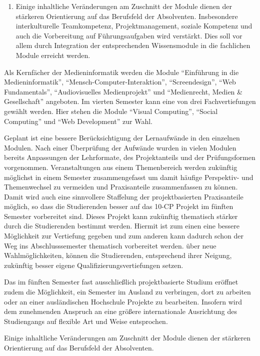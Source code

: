 \begin{enumerate}
\def\labelenumi{\arabic{enumi}.}
\setcounter{enumi}{3}
\tightlist
\item
  Einige inhaltliche Veränderungen am Zuschnitt der Module dienen der
  stärkeren Orientierung auf das Berufsfeld der Absolventen.
  Insbesondere interkulturelle Teamkompetenz, Projektmanagement, soziale
  Kompetenz und auch die Vorbereitung auf Führungsaufgaben wird
  verstärkt. Dies soll vor allem durch Integration der entsprechenden
  Wissensmodule in die fachlichen Module erreicht werden.
\end{enumerate}

Als Kernfächer der Medieninformatik werden die Module ``Einführung in
die Medieninformatik'', ``Mensch-Computer-Interaktion'',
``Screendesign'', ``Web Fundamentals'', ``Audiovisuelles Medienprojekt''
und ``Medienrecht, Medien \& Gesellschaft'' angeboten. Im vierten
Semester kann eine von drei Fachvertiefungen gewählt werden. Hier stehen
die Module ``Visual Computing'', ``Social Computing'' und ``Web
Development'' zur Wahl.

Geplant ist eine bessere Berücksichtigung der Lernaufwände in den
einzelnen Modulen. Nach einer Überprüfung der Aufwände wurden in vielen
Modulen bereits Anpassungen der Lehrformate, des Projektanteils und der
Prüfungsformen vorgenommen. Veranstaltungen aus einem Themenbereich
werden zukünftig möglichst in einem Semester zusammengefasst um damit
häufige Perspektiv- und Themenwechsel zu vermeiden und Praxisanteile
zusammenfassen zu können. Damit wird auch eine sinnvollere Staffelung
der projektbasierten Praxisanteile möglich, so dass die Studierenden
besser auf das 10-CP Projekt im fünften Semester vorbereitet sind.
Dieses Projekt kann zukünftig thematisch stärker durch die Studierenden
bestimmt werden. Hiermit ist zum einen eine bessere Möglichkeit zur
Vertiefung gegeben und zum anderen kann dadurch schon der Weg ins
Abschlusssemester thematisch vorbereitet werden. über neue
Wahlmöglichkeiten, können die Studierenden, entsprechend ihrer Neigung,
zukünftig besser eigene Qualifizierungsvertiefungen setzen.

Das im fünften Semester fast ausschließlich projektbasierte Studium
eröffnet zudem die Möglichkeit, ein Semester im Ausland zu verbringen,
dort zu arbeiten oder an einer ausländischen Hochschule Projekte zu
bearbeiten. Insofern wird dem zunehmenden Anspruch an eine größere
internationale Ausrichtung des Studiengangs auf flexible Art und Weise
entsprochen.

Einige inhaltliche Veränderungen am Zuschnitt der Module dienen der
stärkeren Orientierung auf das Berufsfeld der Absolventen.
